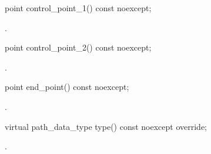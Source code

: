 \begin{itemdecl}
    point control_point_1() const noexcept;
\end{itemdecl}
\begin{itemdescr}
	\pnum
	\returns
	.

\end{itemdescr}

\begin{itemdecl}
    point control_point_2() const noexcept;
\end{itemdecl}
\begin{itemdescr}
	\pnum
	\returns
	.

\end{itemdescr}

\begin{itemdecl}
    point end_point() const noexcept;
\end{itemdecl}
\begin{itemdescr}
	\pnum
	\returns
	.

\end{itemdescr}

\begin{itemdecl}
    virtual path_data_type type() const noexcept override;
\end{itemdecl}
\begin{itemdescr}
	\pnum
	\returns
	.

\end{itemdescr}
